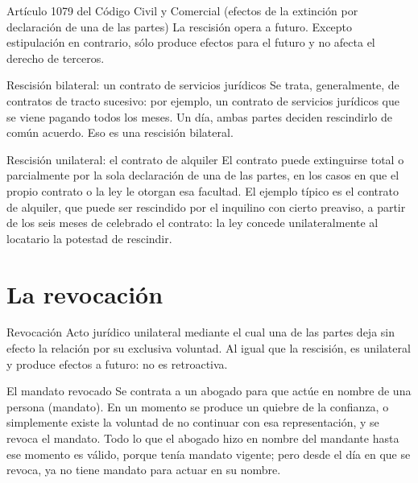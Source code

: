 \documentclass[12pt,oneside]{book}
\begin{document}
\begin{articulo}{Artículo 1079 del Código Civil y Comercial (efectos de la extinción por declaración de una de las partes)}
La rescisión opera a futuro. Excepto estipulación en contrario, sólo produce efectos para el futuro y no afecta el derecho de terceros.
\end{articulo}

\begin{example}{Rescisión bilateral: un contrato de servicios jurídicos}
Se trata, generalmente, de contratos de tracto sucesivo: por ejemplo, un contrato de servicios jurídicos que se viene pagando todos los meses. Un día, ambas partes deciden rescindirlo de común acuerdo. Eso es una rescisión bilateral.
\end{example}

\begin{example}{Rescisión unilateral: el contrato de alquiler}
El contrato puede extinguirse total o parcialmente por la sola declaración de una de las partes, en los casos en que el propio contrato o la ley le otorgan esa facultad. El ejemplo típico es el contrato de alquiler, que puede ser rescindido por el inquilino con cierto preaviso, a partir de los seis meses de celebrado el contrato: la ley concede unilateralmente al locatario la potestad de rescindir.
\end{example}

\section{La revocación}

\begin{definition}{Revocación}
Acto jurídico unilateral mediante el cual una de las partes deja sin efecto la relación por su exclusiva voluntad. Al igual que la rescisión, es unilateral y produce efectos a futuro: no es retroactiva.
\end{definition}

\begin{example}{El mandato revocado}
Se contrata a un abogado para que actúe en nombre de una persona (mandato). En un momento se produce un quiebre de la confianza, o simplemente existe la voluntad de no continuar con esa representación, y se revoca el mandato. Todo lo que el abogado hizo en nombre del mandante hasta ese momento es válido, porque tenía mandato vigente; pero desde el día en que se revoca, ya no tiene mandato para actuar en su nombre.
\end{example}
\end{document}
